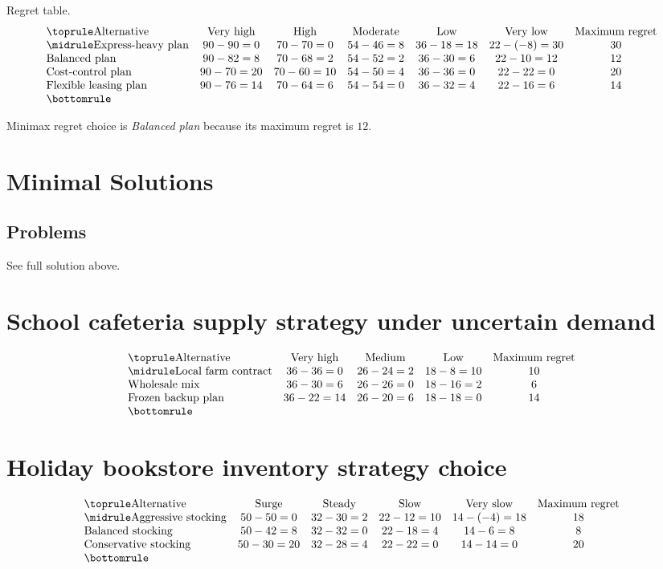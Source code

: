 \begin{ExamProblems}
		Regret table.
		\[
		\begin{array}{lcccccc}
			\toprule
			\text{Alternative} & \text{Very high} & \text{High} & \text{Moderate} & \text{Low} & \text{Very low} & \text{Maximum regret}\\
			\midrule
			\text{Express-heavy plan} & 90-90=0 & 70-70=0 & 54-46=8 & 36-18=18 & 22-(-8)=30 & 30\\
			\text{Balanced plan} & 90-82=8 & 70-68=2 & 54-52=2 & 36-30=6 & 22-10=12 & 12\\
			\text{Cost-control plan} & 90-70=20 & 70-60=10 & 54-50=4 & 36-36=0 & 22-22=0 & 20\\
			\text{Flexible leasing plan} & 90-76=14 & 70-64=6 & 54-54=0 & 36-32=4 & 22-16=6 & 14\\
			\bottomrule
		\end{array}
		\]

		Minimax regret choice is \emph{Balanced plan} because its maximum regret is $12$.
	\end{ExamProblems}


\section{Minimal Solutions}

\subsection*{Problems}
See full solution above.

\section{School cafeteria supply strategy under uncertain demand}
\[\begin{array}{lcccc}
			\toprule
			\text{Alternative} & \text{Very high} & \text{Medium} & \text{Low} & \text{Maximum regret}\\
			\midrule
			\text{Local farm contract} & 36-36=0 & 26-24=2 & 18-8=10 & 10\\
			\text{Wholesale mix} & 36-30=6 & 26-26=0 & 18-16=2 & 6\\
			\text{Frozen backup plan} & 36-22=14 & 26-20=6 & 18-18=0 & 14\\
			\bottomrule
		\end{array}\]

\section{Holiday bookstore inventory strategy choice}
\[\begin{array}{lccccc}
			\toprule
			\text{Alternative} & \text{Surge} & \text{Steady} & \text{Slow} & \text{Very slow} & \text{Maximum regret}\\
			\midrule
			\text{Aggressive stocking} & 50-50=0 & 32-30=2 & 22-12=10 & 14-(-4)=18 & 18\\
			\text{Balanced stocking} & 50-42=8 & 32-32=0 & 22-18=4 & 14-6=8 & 8\\
			\text{Conservative stocking} & 50-30=20 & 32-28=4 & 22-22=0 & 14-14=0 & 20\\
			\bottomrule
		\end{array}\]

